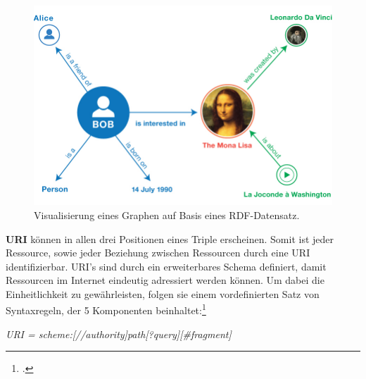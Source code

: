 \documentclass[12pt,a4paper]{article}
\begin{document}
\begin{figure}[H]
  \centering
	\includegraphics[width=1\textwidth]{img/rdf_example.png}  
    \caption[Visualisierung eines Graphen auf Basis eines RDF-Datensatz, \protect\url{w3.org/TR/rdf11-primer}, 10.04.2019.]{Visualisierung eines Graphen auf Basis eines RDF-Datensatz.}
  	\label{fig:rdf_example}
\end{figure}
\textbf{URI} können in allen drei Positionen eines Triple erscheinen. Somit ist jeder Ressource, sowie jeder Beziehung zwischen Ressourcen durch eine URI identifizierbar. URI's sind durch ein erweiterbares Schema definiert, damit Ressourcen im Internet eindeutig adressiert werden können. Um dabei die Einheitlichkeit zu gewährleisten, folgen sie einem vordefinierten Satz von Syntaxregeln, der 5 Komponenten beinhaltet:\footcite[][]{berners2004uniform}
\begin{center}
\textit{URI = scheme:[//authority]path[?query][\#fragment]}
\\
\end{center}
\end{document}
